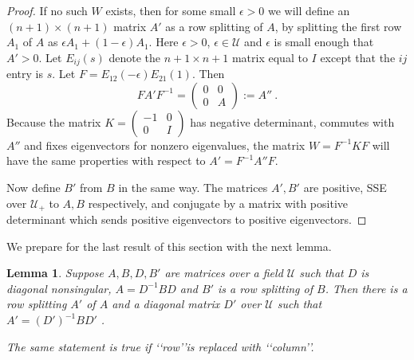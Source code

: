 \documentclass{amsart}
\newtheorem{lemma}[theorem]{Lemma}
\theoremstyle{definition}
\theoremstyle{remark}
\numberwithin{equation}{section}
\begin{document}
{{\begin{proof}
If no such $W$ exists, then for some small $\epsilon >0$ 
we will define an $(n+1)\times (n+1)$ matrix $A'$ 
as a row splitting of $A$, 
by splitting the first row $A_1$ of $A$ as 
$\epsilon A_1 + (1-\epsilon)A_1$. Here $\epsilon >0$, 
$\epsilon \in \mathcal U$ and $\epsilon$ is small enough 
that $ A'>0 $.  Let $E_{ij}(s)$ denote the $n+1\times n+1$ 
matrix equal to $I$ except that the $ij$ entry is $s$. 
Let $F=E_{12}(-\epsilon)E_{21}(1)$. Then 
\[
FA'F^{-1}= \begin{pmatrix} 0 & 0 \\ 0 & A \end{pmatrix} 
:= A'' \ . 
\] 
Because the matrix $K= \left(\begin{smallmatrix} -1 & 0 \\ 0 & I 
\end{smallmatrix}\right) $ 
has negative determinant, commutes with $A''$ and 
fixes eigenvectors for nonzero eigenvalues, the 
matrix $W=F^{-1}KF$ will have the same properties with respect to 
$A'=F^{-1}A''F$. 

Now define $B'$ from $B$ in the same way. The matrices $A',B'$ 
are positive, SSE over $\mathcal U_+$ to $A,B$ respectively, 
and conjugate by a matrix with positive determinant which sends 
positive eigenvectors to positive eigenvectors.  
\end{proof} 


We prepare for 
 the last result of this section 
with the next lemma. 


\begin{lemma} \label{zzzlemma} 
 Suppose $A,B,D,B'$ are  matrices 
over a field $\mathcal U$ such that $D$ is diagonal nonsingular,
 $A=D^{-1}BD$ and $B'$ is a row splitting of $B$. Then there is a 
row splitting $A'$ of $A$ and a diagonal matrix $D'$ over 
$\mathcal U$ such that 
 $A'=(D')^{-1}BD'$ .

The same statement is true if \lq\lq row\rq\rq is replaced with 
\lq\lq column\rq\rq .
\end{lemma}

}}
\end{document}
